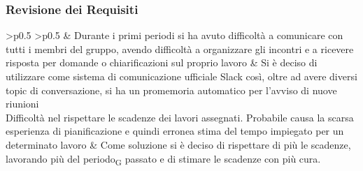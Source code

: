 \subsubsection{Revisione dei Requisiti}
\renewcommand{\arraystretch}{1.5}
\begin{longtable}{
		>{}p{}
		>{}p{}
	}
	\rowcolorhead
	\centering {} &
	\centering \headertitle{Soluzione}
	\endfirsthead
	\endhead
	Durante i primi periodi si ha avuto difficoltà a comunicare con tutti i membri del gruppo, avendo difficoltà a organizzare gli incontri e a ricevere risposta per domande o chiarificazioni sul proprio lavoro & Si è deciso di utilizzare come sistema di comunicazione ufficiale Slack così, oltre ad avere diversi topic di conversazione, si ha un promemoria automatico per l'avviso di nuove riunioni\\

	Difficoltà nel rispettare le scadenze dei lavori assegnati. Probabile causa la scarsa esperienza di pianificazione e quindi erronea stima del tempo impiegato per un determinato lavoro & Come soluzione si è deciso di rispettare di più le scadenze, lavorando più del periodo\textsubscript{G} passato e di stimare le scadenze con più cura.\\
	\caption{Tabella Problemi di organizzazione}
\end{longtable}

